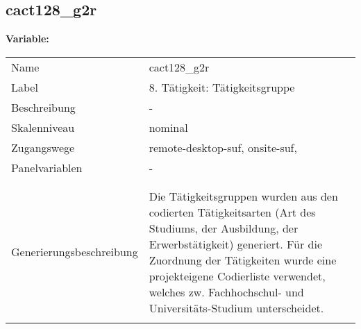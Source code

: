 	
	
	\subsection{cact128\_g2r}
	\label{subSection:cact128_g2r}

	\noindent\textbf{Variable:}\\
		\begin{tabular}{lL{11.3cm}}
			\label{tableVariable:cact128_g2r}
			Name & cact128\_g2r \\
			Label & 8. Tätigkeit: Tätigkeitsgruppe  \\
			Beschreibung & - \\
			Skalenniveau & nominal \\
			Zugangswege &
				remote-desktop-suf,
				onsite-suf,
 \\
			Panelvariablen & -
			 \\
			 \\
 \\
					Generierungsbeschreibung & Die Tätigkeitsgruppen wurden aus den codierten Tätigkeitsarten (Art des Studiums, der Ausbildung, der Erwerbstätigkeit) generiert. Für die Zuordnung der Tätigkeiten wurde eine projekteigene Codierliste verwendet, welches zw. Fachhochschul- und Universitäts-Studium unterscheidet.
				 \\	
			 \\
		\end{tabular}






